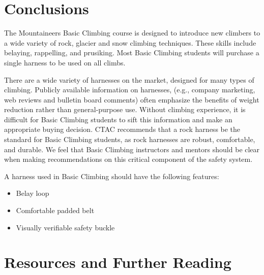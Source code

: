 \documentclass[nonacm,acmtog,authordraft]{acmart}
\begin{document}
\section{Conclusions}
\label{sec:conclusions}

  The Mountaineers Basic Climbing course is designed to introduce new climbers
  to a wide variety of rock, glacier and snow climbing techniques. These skills
  include belaying, rappelling, and prusiking. Most Basic Climbing students
  will purchase a single harness to be used on all climbs.

  There are a wide variety of harnesses on the market, designed for many types
  of climbing. Publicly available information on harnesses, (e.g., company
  marketing, web reviews and bulletin board comments) often emphasize the
  benefits of weight reduction rather than general-purpose use. Without
  climbing experience, it is difficult for Basic Climbing students to sift this
  information and make an appropriate buying decision. CTAC recommends that a
  rock harness be the standard for Basic Climbing students, as rock harnesses
  are robust, comfortable, and durable. We feel that Basic Climbing instructors
  and mentors should be clear when making recommendations on this critical
  component of the safety system.

  A harness used in Basic Climbing should have the following features:
  \begin{itemize}
  \item Belay loop
  \item Comfortable padded belt
  \item Visually verifiable safety buckle
  \end{itemize}

\section{Resources and Further Reading}
\end{document}

